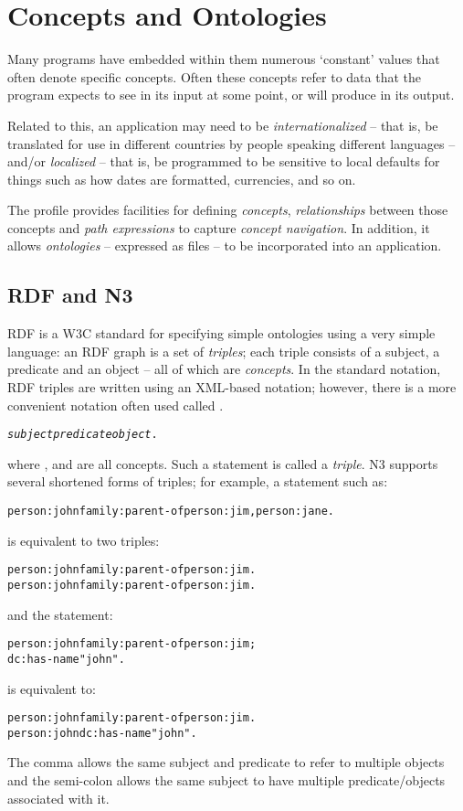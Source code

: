 \chapter{Concepts and Ontologies}
\label{ontology}

Many programs have embedded within them numerous `constant' values that often denote specific concepts. Often these concepts refer to data that the program expects to see in its input at some point, or will produce in its output.

Related to this, an application may need to be \emph{internationalized} -- that is, be translated for use in different countries by people speaking different languages -- and/or \emph{localized} -- that is, be programmed to be sensitive to local defaults for things such as how dates are formatted, currencies, and so on.

The  profile provides facilities for defining \emph{concepts}, \emph{relationships} between those concepts and \emph{path expressions} to capture \emph{concept navigation}. In addition, it allows \emph{ontologies} -- expressed as  files -- to be incorporated into an application. 

\section{RDF and N3}
\label{rdfN3}
RDF is a W3C standard for specifying simple ontologies using a very simple language: an RDF graph is a set of \emph{triples}; each triple consists of a subject, a predicate and an object -- all of which are \emph{concepts}. In the standard notation, RDF triples are written using an XML-based notation; however, there is a more convenient notation often used called . 
\begin{alltt}
\emph{subject} \emph{predicate} \emph{object}.
\end{alltt}
where ,  and  are all concepts. Such a statement is called a \emph{triple}. N3 supports several shortened forms of triples; for example, a statement such as:
\begin{alltt}
person:john family:parent-of person:jim, person:jane.
\end{alltt}
is equivalent to two triples:
\begin{alltt}
person:john family:parent-of person:jim.
person:john family:parent-of person:jim.
\end{alltt}
and the statement:
\begin{alltt}
person:john family:parent-of person:jim;
             dc:has-name "john".
\end{alltt}
is equivalent to:
\begin{alltt}
person:john family:parent-of person:jim.
person:john dc:has-name "john".
\end{alltt}
The comma allows the same subject and predicate to refer to multiple objects and the semi-colon allows the same subject to have multiple predicate/objects associated with it.

